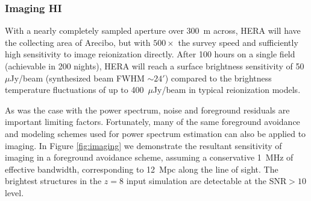\documentclass[preprint]{aastex}
\newcommand{\compress}{\vspace{-0.3in}}
\begin{document}
\compress
\subsubsection{Imaging HI}
\label{sec:imaging_HI}
With a nearly completely sampled aperture over 300~m across, HERA will have the collecting area of Arecibo, but
with $500\times$ the survey speed and sufficiently high sensitivity to image reionization directly.  After 100 hours on a
single field (achievable in 200 nights), HERA will reach a surface brightness sensitivity
of 50~$\mu$Jy/beam (synthesized beam FWHM $\sim 24'$) compared to the brightness temperature fluctuations of up to 400~$\mu$Jy/beam in typical reionization models.

As was the case with the power spectrum, noise and foreground residuals are important limiting factors.  Fortunately, many of the same foreground avoidance and modeling schemes used for power spectrum estimation can also be applied to imaging.  In Figure \ref{fig:imaging} we demonstrate the
resultant sensitivity of imaging in a foreground avoidance scheme, assuming a conservative 1~MHz of effective bandwidth, corresponding to 12~Mpc along the line of
sight.  The brightest structures in the $z=8$ input simulation are detectable at the SNR$>10$ level.

\end{document}
